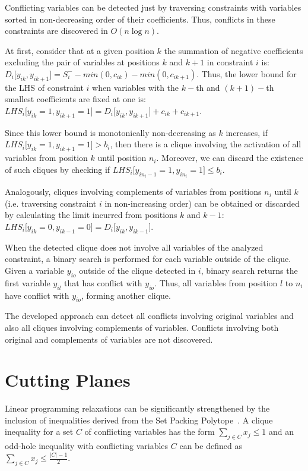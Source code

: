 \documentclass{endm}
\begin{document}
Conflicting variables can be detected just by traversing constraints with variables sorted in non-decreasing order of their coefficients. Thus, conflicts in these constraints are discovered in $O(n \log n)$. 

At first, consider that at a given position $k$ the summation of negative coefficients excluding the pair of variables at positions $k$ and $k+1$ in constraint $i$ is: $\displaystyle D_{i}\lbrack y_{ik}, y_{ik+1} \rbrack = S_i^- - min(0, c_{ik}) - min(0, c_{ik+1})$.  Thus, the lower bound for the LHS of constraint $i$ when variables with the $k-$th and $(k+1)-$th smallest coefficients are fixed at one is: $\displaystyle LHS_{i}\lbrack y_{ik} = 1, y_{ik+1} = 1 \rbrack = D_{i}\lbrack y_{ik}, y_{ik+1}\rbrack + c_{ik} + c_{ik+1}$.

Since this lower bound is monotonically non-decreasing as $k$ increases, if $\displaystyle LHS_{i}\lbrack y_{ik} = 1, y_{ik+1} = 1 \rbrack > b_{i}$, then there is a clique involving the activation of all variables from position $k$ until position $n_i$. Moreover, we can discard the existence of such cliques by checking if $\displaystyle LHS_{i}\lbrack y_{in_i-1} = 1, y_{in_i} = 1 \rbrack \leq b_i$.

Analogously, cliques involving complements of variables from positions $n_i$ until $k$ (i.e. traversing constraint $i$ in non-increasing order) can be obtained or discarded by calculating the limit incurred from positions $k$ and $k-1$: $\displaystyle LHS_{i}\lbrack y_{ik} = 0, y_{ik-1} = 0 \rbrack = D_{i}\lbrack y_{ik}, y_{ik-1}\rbrack$.

When the detected clique does not involve all variables of the analyzed constraint, a binary search is performed for each variable outside of the clique. Given a variable $y_{io}$ outside of the clique detected in $i$, binary search returns the first variable $y_{il}$ that has conflict with $y_{io}$. Thus, all variables from position $l$ to $n_i$ have conflict with $y_{io}$, forming another clique.

The developed approach can detect all conflicts involving original variables and also all cliques involving complements of variables. Conflicts involving both original and complements of variables are not discovered.

\section{Cutting Planes}\label{cut}

Linear programming relaxations can be significantly strengthened by the inclusion of inequalities derived from the Set Packing Polytope~\cite{Rebennack2009}. A clique inequality for a set $C$ of conflicting variables has the form $\displaystyle \sum_{j\in C}x_{j} \leq 1$ and an odd-hole inequality with conflicting variables $C$ can be defined as $\displaystyle \sum_{j\in C}x_{j} \leq \frac{|C|-1}{2}$.
\end{document}
